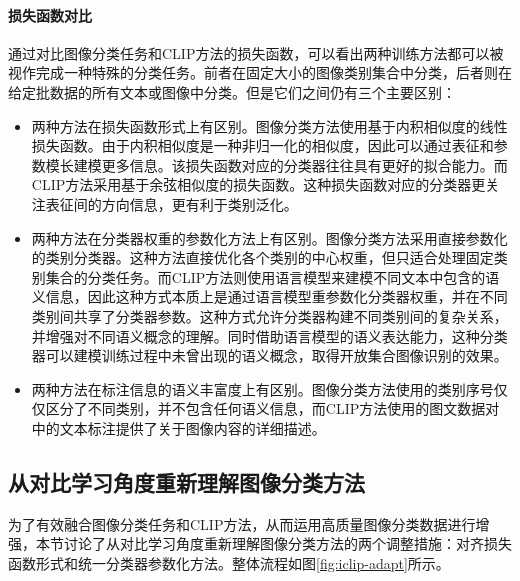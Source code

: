 \paragraph{损失函数对比} 通过对比图像分类任务和CLIP方法的损失函数，可以看出两种训练方法都可以被视作完成一种特殊的分类任务。前者在固定大小的图像类别集合中分类，后者则在给定批数据的所有文本或图像中分类。但是它们之间仍有三个主要区别：
\begin{itemize}
    \item 两种方法在损失函数形式上有区别。图像分类方法使用基于内积相似度的线性损失函数。由于内积相似度是一种非归一化的相似度，因此可以通过表征和参数模长建模更多信息。该损失函数对应的分类器往往具有更好的拟合能力。而CLIP方法采用基于余弦相似度的损失函数。这种损失函数对应的分类器更关注表征间的方向信息，更有利于类别泛化\cite{cao2020parametric,DengArcFace,wang2018cosface}。
    \item 两种方法在分类器权重的参数化方法上有区别。图像分类方法采用直接参数化的类别分类器。这种方法直接优化各个类别的中心权重，但只适合处理固定类别集合的分类任务。而CLIP方法则使用语言模型来建模不同文本中包含的语义信息，因此这种方式本质上是通过语言模型重参数化分类器权重，并在不同类别间共享了分类器参数。这种方式允许分类器构建不同类别间的复杂关系，并增强对不同语义概念的理解。同时借助语言模型的语义表达能力，这种分类器可以建模训练过程中未曾出现的语义概念，取得开放集合图像识别的效果。
    \item 两种方法在标注信息的语义丰富度上有区别。图像分类方法使用的类别序号仅仅区分了不同类别，并不包含任何语义信息，而CLIP方法使用的图文数据对中的文本标注提供了关于图像内容的详细描述。
\end{itemize}


\subsection{从对比学习角度重新理解图像分类方法}
\label{sec:iclip-adapt-classification}
为了有效融合图像分类任务和CLIP方法，从而运用高质量图像分类数据进行增强，本节讨论了从对比学习角度重新理解图像分类方法的两个调整措施：对齐损失函数形式和统一分类器参数化方法。整体流程如图\ref{fig:iclip-adapt}所示。

